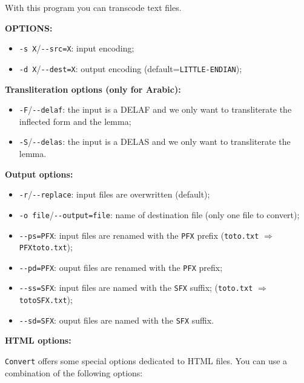 \bigskip
\noindent With this program you can transcode text files.

\bigskip
\noindent \textbf{OPTIONS:}
\begin{itemize}
  \item \verb+-s X+/\verb+--src=X+: input encoding;
  \item \verb+-d X+/\verb+--dest=X+: output encoding
  (default=\verb$LITTLE-ENDIAN$);
\end{itemize}

\bigskip
\noindent \textbf{Transliteration options (only for Arabic):}
\begin{itemize}
  \item \verb+-F+/\verb+--delaf+: the input is a DELAF and we only want to transliterate the inflected form and the lemma;
  \item \verb+-S+/\verb+--delas+: the input is a DELAS and we only want to transliterate the lemma.
\end{itemize}


\bigskip
\noindent \textbf{Output options:}
\begin{itemize}
  \item \verb+-r+/\verb+--replace+: input files are overwritten (default);
  \item \verb+-o file+/\verb+--output=file+: name of destination file (only one file to convert);
  \item \verb+--ps=PFX+: input files are renamed with the \verb+PFX+ prefix
        (\verb+toto.txt+ $\Rightarrow$ \verb+PFXtoto.txt+);
  \item \verb+--pd=PFX+: ouput files are renamed with the \verb+PFX+ prefix;
  \item \verb+--ss=SFX+: input files are named with the \verb+SFX+ suffix;
        (\verb+toto.txt+ $\Rightarrow$ \verb+totoSFX.txt+);
  \item \verb+--sd=SFX+: ouput files are named with the \verb+SFX+ suffix.
\end{itemize}

\bigskip
\noindent \textbf{HTML options:}

\noindent \verb+Convert+ offers some special options dedicated to HTML files. You can 
use a combination of the following options:


